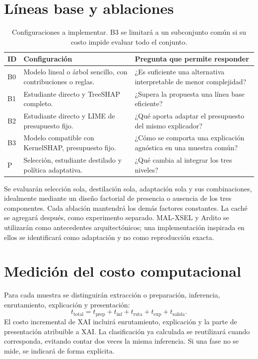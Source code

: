 \section{Líneas base y ablaciones}
\begin{table}[htbp]
\centering\small
\begin{tabularx}{\textwidth}{p{1cm}XX}
\toprule
ID & Configuración & Pregunta que permite responder \\
\midrule
B0 & Modelo lineal o árbol sencillo, con contribuciones o reglas. & ¿Es suficiente una alternativa interpretable de menor complejidad? \\
B1 & Estudiante directo y TreeSHAP completo. & ¿Supera la propuesta una línea base eficiente? \\
B2 & Estudiante directo y LIME de presupuesto fijo. & ¿Qué aporta adaptar el presupuesto del mismo explicador? \\
B3 & Modelo compatible con KernelSHAP, presupuesto fijo. & ¿Cómo se comporta una explicación agnóstica en una muestra común? \\
P & Selección, estudiante destilado y política adaptativa. & ¿Qué cambia al integrar los tres niveles? \\
\bottomrule
\end{tabularx}
\caption{Configuraciones a implementar. B3 se limitará a un subconjunto común si su costo impide evaluar todo el conjunto.}
\end{table}

Se evaluarán selección sola, destilación sola, adaptación sola y sus combinaciones, idealmente mediante un diseño factorial de presencia o ausencia de los tres componentes. Cada ablación mantendrá los demás factores constantes. La caché se agregará después, como experimento separado. MAL-XSEL y Ardito se utilizarán como antecedentes arquitectónicos; una implementación inspirada en ellos se identificará como adaptación y no como reproducción exacta.

\section{Medición del costo computacional}
Para cada muestra se distinguirán extracción o preparación, inferencia, enrutamiento, explicación y presentación:
\begin{equation}
t_{\mathrm{total}}=t_{\mathrm{prep}}+t_{\mathrm{inf}}+t_{\mathrm{ruta}}+t_{\mathrm{exp}}+t_{\mathrm{salida}}.
\end{equation}
El costo incremental de XAI incluirá enrutamiento, explicación y la parte de presentación atribuible a XAI. La clasificación ya calculada se reutilizará cuando corresponda, evitando contar dos veces la misma inferencia. Si una fase no se mide, se indicará de forma explícita.

